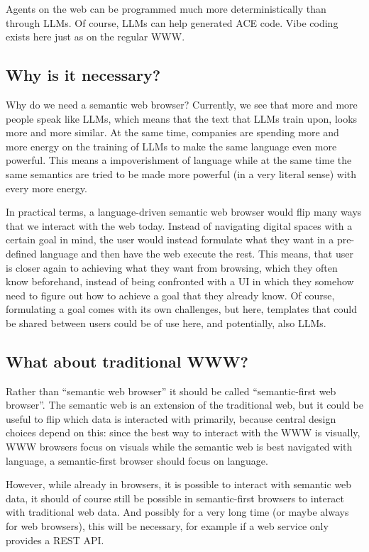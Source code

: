 \documentclass[12pt,a4paper]{article}
\begin{document}
Agents on the web can be programmed much more deterministically than through LLMs. Of course, LLMs can help generated ACE code. Vibe coding exists here just as on the regular WWW.

\subsection{Why is it necessary?}

Why do we need a semantic web browser? Currently, we see that more and more people speak like LLMs, which means that the text that LLMs train upon, looks more and more similar. At the same time, companies are spending more and more energy on the training of LLMs to make the same language even more powerful. This means a impoverishment of language while at the same time the same semantics are tried to be made more powerful (in a very literal sense) with every more energy.

In practical terms, a language-driven semantic web browser would flip many ways that we interact with the web today. Instead of navigating digital spaces with a certain goal in mind, the user would instead formulate what they want in a pre-defined language and then have the web execute the rest. This means, that user is closer again to achieving what they want from browsing, which they often know beforehand, instead of being confronted with a UI in which they somehow need to figure out how to achieve a goal that they already know. Of course, formulating a goal comes with its own challenges, but here, templates that could be shared between users could be of use here, and potentially, also LLMs.

\subsection{What about traditional WWW?}

Rather than ``semantic web browser'' it should be called ``semantic-first web browser''. The semantic web is an extension of the traditional web, but it could be useful to flip which data is interacted with primarily, because central design choices depend on this: since the best way to interact with the WWW is visually, WWW browsers focus on visuals while the semantic web is best navigated with language, a semantic-first browser should focus on language.

However, while already in browsers, it is possible to interact with semantic web data, it should of course still be possible in semantic-first browsers to interact with traditional web data. And possibly for a very long time (or maybe always for web browsers), this will be necessary, for example if a web service only provides a REST API.
\end{document}

